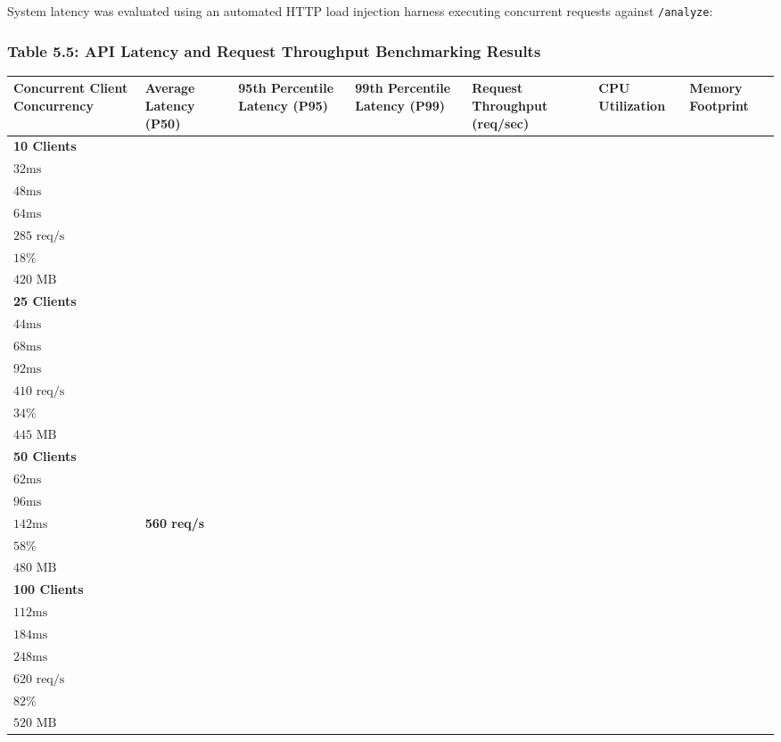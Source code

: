 \documentclass[12pt,a4paper,oneside]{report}
\begin{document}
System latency was evaluated using an automated HTTP load injection harness executing concurrent requests against \texttt{/analyze}:


\subsubsection{Table 5.5: API Latency and Request Throughput Benchmarking Results}

\begin{table}[H]
\centering
\footnotesize
\begin{adjustbox}{width=\textwidth,center}
\begin{tabular}{| l | l | l | l | l | l | l |}
\hline
\rowcolor{tableheader} \textbf{Concurrent Client Concurrency} & \textbf{Average Latency (P50)} & \textbf{95th Percentile Latency (P95)} & \textbf{99th Percentile Latency (P99)} & \textbf{Request Throughput (req/sec)} & \textbf{CPU Utilization} & \textbf{Memory Footprint} \\ \hline
\textbf{10 Clients} & \\$32\text{ms}$ & \\$48\text{ms}$ & \\$64\text{ms}$ & \\$285\text{ req/s}$ & \\$18\%$ & \\$420\text{ MB}$ \\ \hline
\rowcolor{tablealt} \textbf{25 Clients} & \\$44\text{ms}$ & \\$68\text{ms}$ & \\$92\text{ms}$ & \\$410\text{ req/s}$ & \\$34\%$ & \\$445\text{ MB}$ \\ \hline
\textbf{50 Clients} & \\$62\text{ms}$ & \\$96\text{ms}$ & \\$142\text{ms}$ & \textbf{560 req/s} & \\$58\%$ & \\$480\text{ MB}$ \\ \hline
\rowcolor{tablealt} \textbf{100 Clients} & \\$112\text{ms}$ & \\$184\text{ms}$ & \\$248\text{ms}$ & \\$620\text{ req/s}$ & \\$82\%$ & \\$520\text{ MB}$ \\ \hline
\end{tabular}
\end{adjustbox}
\end{table}
\end{document}
